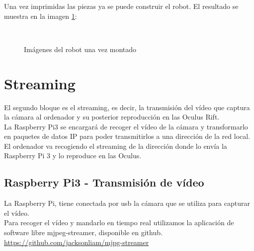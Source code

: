 \documentclass[twoside, 11pt]{epstfg}
\begin{document}
Una vez imprimidas las piezas ya se puede construir el robot. El resultado se muestra en la imagen \ref{fotoRobot}:

\begin{figure}[H]
	\centering
	 \\
	
	\caption{Imágenes del robot una vez montado}
	\label{fotoRobot} 
\end{figure}
 
\section{Streaming}
El segundo bloque es el streaming, es decir, la transmisión del vídeo que captura la cámara al ordenador y su posterior reproducción en las Oculus Rift.\\
La Raspberry Pi3 se encargará de recoger el vídeo de la cámara y transformarlo en paquetes de datos IP para poder transmitirlos a una dirección de la red local.\\El ordenador va recogiendo el streaming de la dirección donde lo envía la Raspberry Pi 3 y lo reproduce en las Oculus.

\subsection{Raspberry Pi3 - Transmisión de vídeo}
La Raspberry Pi, tiene conectada por usb la cámara que se utiliza para capturar el vídeo.\\
Para recoger el vídeo y mandarlo en tiempo real utilizamos la aplicación de software libre mjpeg-streamer, disponible en github. \url{https://github.com/jacksonliam/mjpg-streamer}
\end{document}
